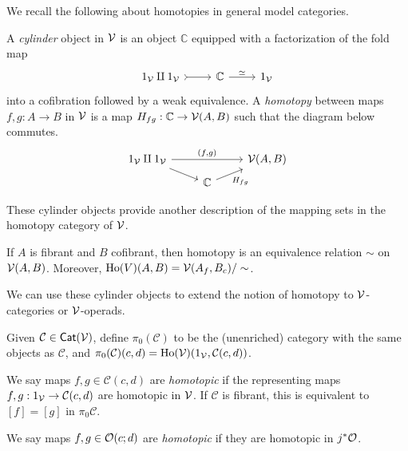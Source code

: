 \documentclass[a4paper,10pt
]{article}%
\renewcommand{\1}{\ensuremath{\mathbb{id}}}
\begin{document}
We recall the following about homotopies in general model categories.
\begin{definition}
      A \textit{cylinder} object in $\mathcal V$ is an object $\mathbb C$ equipped with a factorization of the fold map
      \begin{equation}
            \begin{tikzcd}
                  1_\V \amalg 1_\V \arrow[r, tail]
                  &
                  \mathbb C \arrow[r, "\simeq"]
                  &
                  1_\V
            \end{tikzcd}
      \end{equation}
      into a cofibration followed by a weak equivalence.
      A \textit{homotopy} between maps $f,g: A \to B$ in $\mathcal V$ is a map $H_{fg}: \mathbb C \to \mathcal V(A,B)$ such that
      the diagram below commutes.
      \begin{equation}
            \begin{tikzcd}[row sep = tiny]
                  1_\V \amalg 1_\V \arrow[rr, "{(f,g)}"] \arrow[dr]
                  &&
                  \V(A,B)
                  \\
                  &
                  \mathbb C \arrow[ur, "H_{fg}"']
            \end{tikzcd}
      \end{equation}
\end{definition}

These cylinder objects provide another description of the mapping sets in the homotopy category of $\mathcal V$.

\begin{proposition}       
      If $A$ is fibrant and $B$ cofibrant, then
      homotopy is an equivalence relation $\sim$ on $\mathcal V(A,B)$.
      Moreover, 
      $\operatorname{Ho}(V)(A,B) = \mathcal V(A_f, B_c)/\sim$.
\end{proposition}

We can use these cylinder objects to extend the notion of homotopy to $\mathcal V$-categories or $\mathcal V$-operads.

\begin{definition}
      \label{HTPY_DEFN}
      Given $\mathcal C \in \mathsf{Cat}(\mathcal V)$, define $\pi_0(\mathcal C)$ to be the (unenriched) category with
      the same objects as $\mathcal C$, and $\pi_0(\mathcal C)(c,d) = \operatorname{Ho}(\mathcal V)(1_{\mathcal V}, \mathcal C(c,d))$.

      We say maps $f,g \in \mathcal C(c,d)$ are \textit{homotopic}
      if the representing maps $f,g: 1_{\mathcal V} \to \mathcal C(c,d)$ are homotopic in $\mathcal V$.
      If $\mathcal C$ is fibrant, this is equivalent to $[f] = [g]$ in $\pi_0\mathcal C$.

      We say maps $f,g \in \mathcal{O}(c;d)$ are \textit{homotopic} if they are homotopic in $j^{\**}\O$. 
\end{definition}
\end{document}
